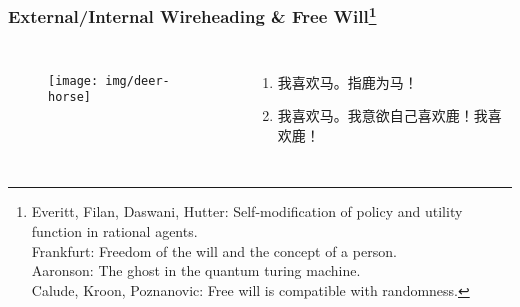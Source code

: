\documentclass[UTF8,11pt,colorlinks,compress,openany]{beamer}%
\begin{document}
\begin{frame}\frametitle{External/Internal Wireheading \& Free Will\footnote{\tiny Everitt, Filan, Daswani, Hutter: Self-modification of policy and utility function in rational agents.\\
Frankfurt: Freedom of the will and the concept of a person.\\
Aaronson: The ghost in the quantum turing machine.\\
Calude, Kroon, Poznanovic: Free will is compatible with randomness.}}
\begin{columns}
\begin{figure}[!htbp]
\begin{flushright}
	\texttt{[image: img/deer-horse]}
\end{flushright}
\end{figure}
\begin{enumerate}
	\item 我喜欢马。指鹿为马！
	\item 我喜欢马。我意欲自己喜欢鹿！我喜欢鹿！
\end{enumerate}
\end{columns}
\begin{center}
\end{center}
\end{frame}
\end{document}
